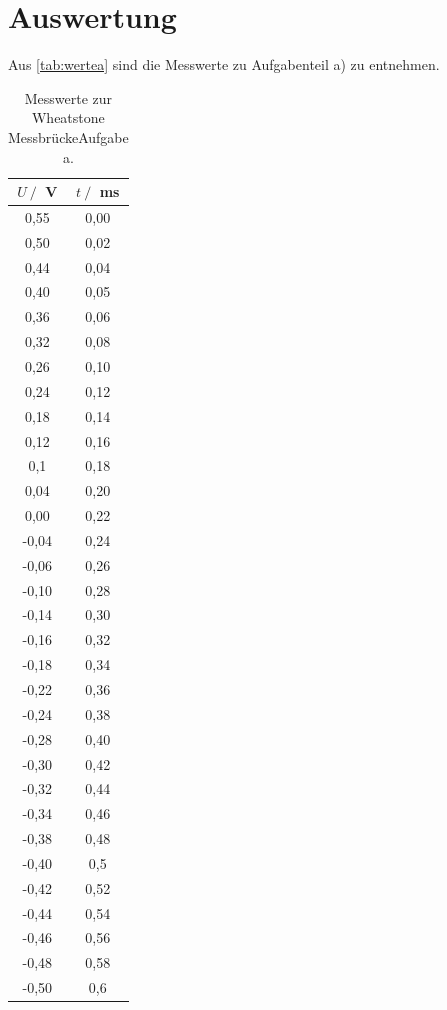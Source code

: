 \section{Auswertung}
\label{sec:Auswertung}

Aus \autoref{tab:wertea} sind die Messwerte zu Aufgabenteil a) zu entnehmen.
\begin{table}[H]
    \centering
    \caption{Messwerte zur Wheatstone MessbrückeAufgabe a.}
    \label{tab:wertea}
    \begin{tabular}{c c}
    \toprule
    $U \:/\:$ V & $t \:/\:$ ms \\
    \midrule
    0,55 & 0,00 \\
    0,50 & 0,02 \\
    0,44 & 0,04 \\
    0,40 & 0,05 \\
    0,36 & 0,06 \\
    0,32 & 0,08 \\
    0,26 & 0,10 \\
    0,24 & 0,12 \\
    0,18 & 0,14 \\
    0,12 & 0,16 \\
    0,1 & 0,18 \\
    0,04 & 0,20 \\
    0,00 & 0,22 \\
    -0,04 & 0,24 \\
    -0,06 & 0,26 \\
    -0,10 & 0,28 \\
    -0,14 & 0,30 \\
    -0,16 & 0,32 \\
    -0,18 & 0,34 \\
    -0,22 & 0,36 \\
    -0,24 & 0,38 \\
    -0,28 & 0,40 \\
    -0,30 & 0,42 \\
    -0,32 & 0,44 \\
    -0,34 & 0,46 \\
    -0,38 & 0,48 \\
    -0,40 & 0,5 \\
    -0,42 & 0,52 \\
    -0,44 & 0,54 \\
    -0,46 & 0,56 \\
    -0,48 & 0,58 \\
    -0,50 & 0,6 \\
    \bottomrule
    \end{tabular}
\end{table}

